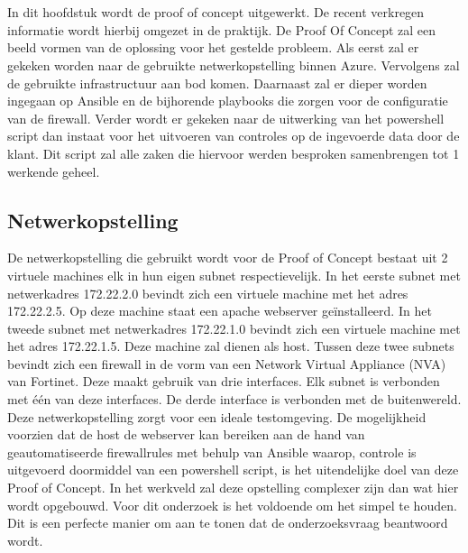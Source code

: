 \graphicspath{ {./graphics/} }
\chapter{}%

In dit hoofdstuk wordt de proof of concept uitgewerkt. De recent verkregen informatie wordt hierbij omgezet in de praktijk. De Proof Of Concept zal een beeld vormen van de oplossing voor het gestelde probleem. Als eerst zal er gekeken worden naar de gebruikte netwerkopstelling binnen Azure.
Vervolgens zal de gebruikte infrastructuur aan bod komen. Daarnaast zal er dieper worden ingegaan op Ansible en de bijhorende playbooks die zorgen voor de configuratie van de firewall. Verder wordt er gekeken naar de uitwerking van
het powershell script dan instaat voor het uitvoeren van controles op de ingevoerde data door de klant. Dit script zal alle zaken die hiervoor werden besproken samenbrengen tot 1 werkende geheel. 

\newpage

\section{Netwerkopstelling}
De netwerkopstelling die gebruikt wordt voor de Proof of Concept bestaat uit 2 virtuele machines elk in hun eigen subnet respectievelijk. In het eerste subnet met netwerkadres 172.22.2.0 bevindt zich een virtuele machine met het adres 172.22.2.5. Op deze machine staat een apache webserver geïnstalleerd. In het tweede subnet met netwerkadres 172.22.1.0 bevindt zich een virtuele machine met het adres 172.22.1.5. Deze machine zal dienen als host. Tussen deze twee subnets bevindt zich een firewall in de vorm van een Network Virtual Appliance (NVA) van Fortinet. Deze maakt gebruik van drie interfaces. Elk subnet is verbonden met één van deze interfaces. De derde interface is verbonden met de buitenwereld. Deze netwerkopstelling zorgt voor een ideale testomgeving. De mogelijkheid voorzien dat de host de webserver kan bereiken aan de hand van geautomatiseerde firewallrules met behulp van Ansible waarop, controle is uitgevoerd doormiddel van een powershell script, is het uitendelijke doel van deze Proof of Concept. In het werkveld zal deze opstelling complexer zijn dan wat hier wordt opgebouwd. Voor dit onderzoek is het voldoende om het simpel te houden. Dit is een perfecte manier om aan te tonen dat de onderzoeksvraag beantwoord wordt. 
\newline

